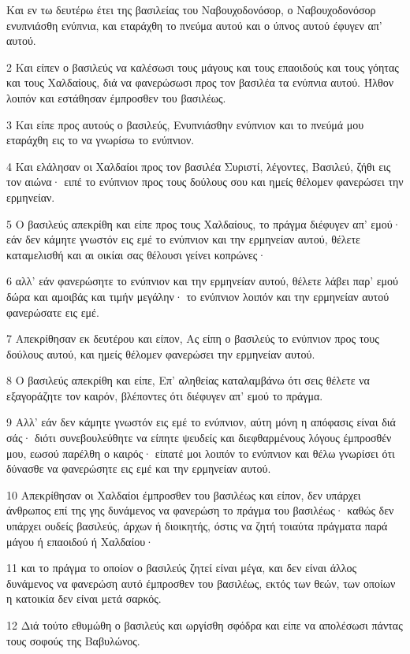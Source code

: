 \par Και εν τω δευτέρω έτει της βασιλείας του Ναβουχοδονόσορ, ο Ναβουχοδονόσορ ενυπνιάσθη ενύπνια, και εταράχθη το πνεύμα αυτού και ο ύπνος αυτού έφυγεν απ' αυτού.
\par 2 Και είπεν ο βασιλεύς να καλέσωσι τους μάγους και τους επαοιδούς και τους γόητας και τους Χαλδαίους, διά να φανερώσωσι προς τον βασιλέα τα ενύπνια αυτού. Ήλθον λοιπόν και εστάθησαν έμπροσθεν του βασιλέως.
\par 3 Και είπε προς αυτούς ο βασιλεύς, Ενυπνιάσθην ενύπνιον και το πνεύμά μου εταράχθη εις το να γνωρίσω το ενύπνιον.
\par 4 Και ελάλησαν οι Χαλδαίοι προς τον βασιλέα Συριστί, λέγοντες, Βασιλεύ, ζήθι εις τον αιώνα· ειπέ το ενύπνιον προς τους δούλους σου και ημείς θέλομεν φανερώσει την ερμηνείαν.
\par 5 Ο βασιλεύς απεκρίθη και είπε προς τους Χαλδαίους, το πράγμα διέφυγεν απ' εμού· εάν δεν κάμητε γνωστόν εις εμέ το ενύπνιον και την ερμηνείαν αυτού, θέλετε καταμελισθή και αι οικίαι σας θέλουσι γείνει κοπρώνες·
\par 6 αλλ' εάν φανερώσητε το ενύπνιον και την ερμηνείαν αυτού, θέλετε λάβει παρ' εμού δώρα και αμοιβάς και τιμήν μεγάλην· το ενύπνιον λοιπόν και την ερμηνείαν αυτού φανερώσατε εις εμέ.
\par 7 Απεκρίθησαν εκ δευτέρου και είπον, Ας είπη ο βασιλεύς το ενύπνιον προς τους δούλους αυτού, και ημείς θέλομεν φανερώσει την ερμηνείαν αυτού.
\par 8 Ο βασιλεύς απεκρίθη και είπε, Επ' αληθείας καταλαμβάνω ότι σεις θέλετε να εξαγοράζητε τον καιρόν, βλέποντες ότι διέφυγεν απ' εμού το πράγμα.
\par 9 Αλλ' εάν δεν κάμητε γνωστόν εις εμέ το ενύπνιον, αύτη μόνη η απόφασις είναι διά σάς· διότι συνεβουλεύθητε να είπητε ψευδείς και διεφθαρμένους λόγους έμπροσθέν μου, εωσού παρέλθη ο καιρός· είπατέ μοι λοιπόν το ενύπνιον και θέλω γνωρίσει ότι δύνασθε να φανερώσητε εις εμέ και την ερμηνείαν αυτού.
\par 10 Απεκρίθησαν οι Χαλδαίοι έμπροσθεν του βασιλέως και είπον, δεν υπάρχει άνθρωπος επί της γης δυνάμενος να φανερώση το πράγμα του βασιλέως· καθώς δεν υπάρχει ουδείς βασιλεύς, άρχων ή διοικητής, όστις να ζητή τοιαύτα πράγματα παρά μάγου ή επαοιδού ή Χαλδαίου·
\par 11 και το πράγμα το οποίον ο βασιλεύς ζητεί είναι μέγα, και δεν είναι άλλος δυνάμενος να φανερώση αυτό έμπροσθεν του βασιλέως, εκτός των θεών, των οποίων η κατοικία δεν είναι μετά σαρκός.
\par 12 Διά τούτο εθυμώθη ο βασιλεύς και ωργίσθη σφόδρα και είπε να απολέσωσι πάντας τους σοφούς της Βαβυλώνος.
